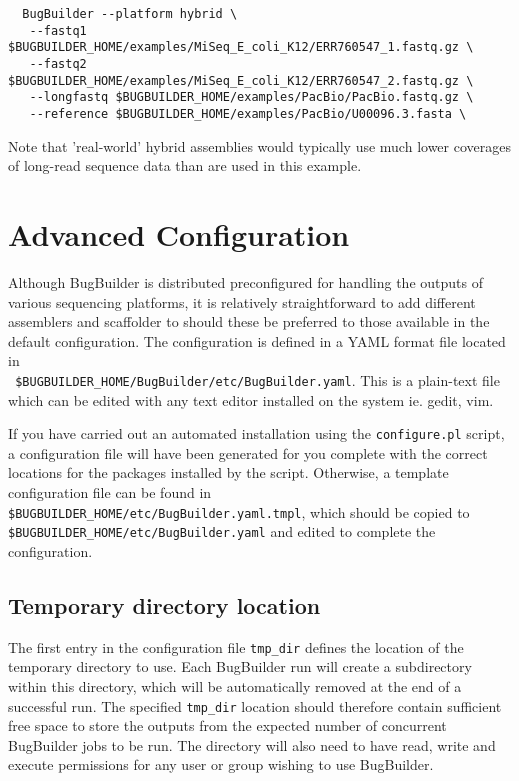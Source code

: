 \documentclass[a4paper,10pt]{article}
\begin{document}
\begin{verbatim}
  BugBuilder --platform hybrid \
   --fastq1 $BUGBUILDER_HOME/examples/MiSeq_E_coli_K12/ERR760547_1.fastq.gz \
   --fastq2 $BUGBUILDER_HOME/examples/MiSeq_E_coli_K12/ERR760547_2.fastq.gz \
   --longfastq $BUGBUILDER_HOME/examples/PacBio/PacBio.fastq.gz \
   --reference $BUGBUILDER_HOME/examples/PacBio/U00096.3.fasta \
\end{verbatim}

Note that 'real-world' hybrid assemblies would typically use much  lower
coverages of long-read sequence data than are used in this example.

\section{Advanced Configuration}

Although BugBuilder is distributed preconfigured for handling the outputs of
various sequencing platforms, it is relatively straightforward to add different
assemblers and scaffolder to should these be preferred to those available in
the default configuration. The configuration is defined in a YAML format file located in \\ {\tt
\$BUGBUILDER\_HOME/BugBuilder/etc/BugBuilder.yaml}. This is a plain-text file
which can be edited with any text editor installed on the system ie. gedit,
vim. 

If you have carried out an automated installation using the {\tt configure.pl}
script, a configuration file will have been generated for you complete with the
correct locations for the packages installed by the script. Otherwise, a
template configuration file can be found in {\tt
\$BUGBUILDER\_HOME/etc/BugBuilder.yaml.tmpl}, which should be copied to {\tt
\$BUGBUILDER\_HOME/etc/BugBuilder.yaml} and edited to complete the
configuration.

\subsection{Temporary directory location}

The first entry in the configuration file {\tt tmp\_dir} defines the location of
the temporary directory to use. Each BugBuilder run will create a subdirectory
within this directory, which will be automatically removed at the end of a
successful run.  The specified {\tt tmp\_dir} location should therefore contain
sufficient free space to store the outputs from the expected number of
concurrent BugBuilder jobs to be run. The directory will also  need to have
read, write and execute permissions for any user or group wishing to use
BugBuilder.
\end{document}
